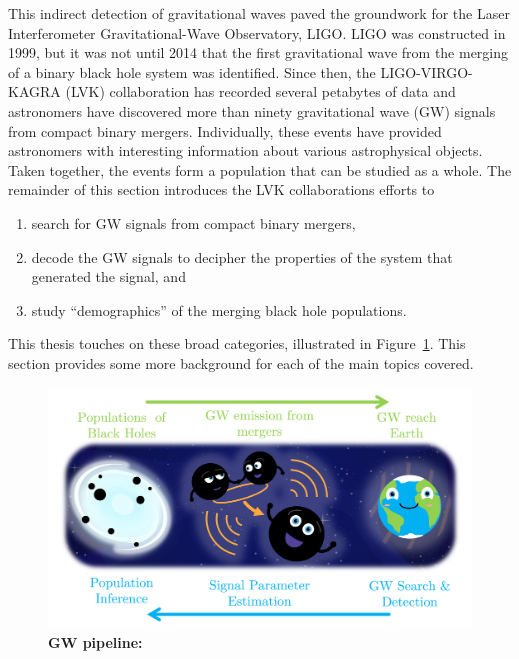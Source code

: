 This indirect detection of gravitational waves paved the groundwork for the Laser Interferometer Gravitational-Wave Observatory, LIGO. 
LIGO was constructed in 1999, but it was not until 2014 that the first gravitational wave from the merging of a binary black hole system was identified.
Since then, the LIGO-VIRGO-KAGRA (LVK) collaboration has recorded several petabytes of data and astronomers have discovered more than ninety gravitational wave (GW) signals from compact binary mergers.
Individually, these events have provided astronomers with interesting information about various astrophysical objects. 
Taken together, the events form a population that can be studied as a whole. 
The remainder of this section introduces the LVK collaborations efforts to 
\begin{enumerate}[i]
\item search for GW signals from compact binary mergers,
\item decode the GW signals to decipher the properties of the system that generated the signal, and 
\item study ``demographics'' of the merging black hole populations.
\end{enumerate}
This thesis touches on these broad categories, illustrated in Figure~\ref{fig:gw_pipeline}. 
This section provides some more background for each of the main topics covered. 

\begin{figure}
\begin{center}
  \centerline{\includegraphics[width=1.1\linewidth]{src/figures/gw_pipeline.png}}
  \caption{\textbf{GW pipeline:}  }
  \label{fig:gw_pipeline}
\end{center}
\end{figure}



